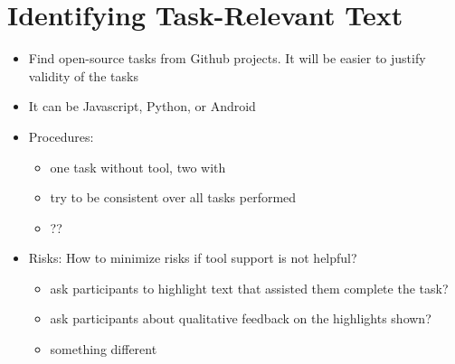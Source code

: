 \setcounter{chapter}{5}
\setcounter{rq}{1}


\chapter{Identifying Task-Relevant Text}
\label{ch:assisting}






\begin{itemize}
    \item Find open-source tasks from Github projects. It will be easier to justify validity of the tasks
    \item It can be Javascript, Python, or Android
    \item Procedures: 
    \begin{itemize}
        \item one task without tool, two with 
        \item try to be consistent over all tasks performed
        \item ??
    \end{itemize}
    \item Risks: How to minimize risks if tool support is not helpful?
    \begin{itemize}
        \item ask participants to highlight text that assisted them complete the task?
        \item ask participants about qualitative feedback on the highlights shown?
        \item something different
    \end{itemize}
\end{itemize}



